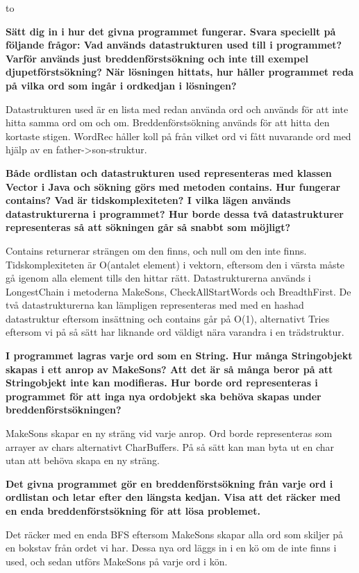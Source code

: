 \documentclass[11pt]{exam}
\begin{document}
\lstset{language=Python,numbers=left}

\vspace{0.1in} 
\hbox to \textwidth{Name:\enspace\hrulefill} 

\begin{questions}

\question \textbf{Sätt dig in i hur det givna programmet fungerar. Svara speciellt på följande frågor: Vad används datastrukturen used till i programmet? Varför används just breddenförstsökning och inte till exempel djupetförstsökning? När lösningen hittats, hur håller programmet reda på vilka ord som ingår i ordkedjan i lösningen?}

Datastrukturen used är en lista med redan använda ord och används för att inte hitta samma ord om och om. Breddenförstsökning används för att hitta den kortaste stigen. WordRec håller koll på från vilket ord vi fått nuvarande ord med hjälp av en father->son-struktur.

\question \textbf{Både ordlistan och datastrukturen used representeras med klassen Vector i Java och sökning görs med metoden contains. Hur fungerar contains? Vad är tidskomplexiteten? I vilka lägen används datastrukturerna i programmet? Hur borde dessa två datastrukturer representeras så att sökningen går så snabbt som möjligt?}

Contains returnerar strängen om den finns, och null om den inte finns. Tidskomplexiteten är O(antalet element) i vektorn, eftersom den i värsta måste gå igenom alla element tills den hittar rätt. Datastrukturerna används i LongestChain i metoderna MakeSons, CheckAllStartWords och BreadthFirst. De två datastrukturerna kan lämpligen representeras med med en hashad datastruktur eftersom insättning och contains går på O(1), alternativt Tries eftersom vi på så sätt har liknande ord väldigt nära varandra i en trädstruktur.

\question \textbf{I programmet lagras varje ord som en String. Hur många Stringobjekt skapas i ett anrop av MakeSons? Att det är så många beror på att Stringobjekt inte kan modifieras. Hur borde ord representeras i programmet för att inga nya ordobjekt ska behöva skapas under breddenförstsökningen?}

MakeSons skapar en ny sträng vid varje anrop. Ord borde representeras som arrayer av chars alternativt CharBuffers. På så sätt kan man byta ut en char utan att behöva skapa en ny sträng.

\question \textbf{Det givna programmet gör en breddenförstsökning från varje ord i ordlistan och letar efter den längsta kedjan. Visa att det räcker med en enda breddenförstsökning för att lösa problemet.}

Det räcker med en enda BFS eftersom MakeSons skapar alla ord som skiljer på en bokstav från ordet vi har. Dessa nya ord läggs in i en kö om de inte finns i used, och sedan utförs MakeSons på varje ord i kön.

\end{questions}
\end{document}
